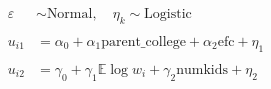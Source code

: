 \documentclass[aspectratio=169]{beamer}
\begin{document}
\begin{frame}




\begin{align*}
\varepsilon &\sim \text{Normal}, \quad \eta_k \sim \text{Logistic} \\
& \\
u_{i1} &= \alpha_0 + \alpha_1 \text{parent\_college} + \alpha_2 \text{efc} + \eta_1 \\
& \\
u_{i2} &= \gamma_0 + \gamma_1 \mathbb{E} \log w_i + \gamma_2 \text{numkids} + \eta_2
\end{align*}

\end{frame}
\end{document}
